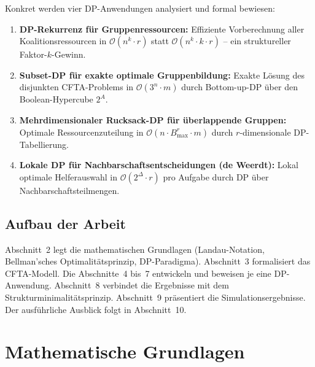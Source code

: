 ﻿\documentclass[a4paper,12pt]{article}
\theoremstyle{definition}
\begin{document}
Konkret werden vier DP-Anwendungen analysiert und formal bewiesen:
\begin{enumerate}
    \item \textbf{DP-Rekurrenz f\"{u}r Gruppenressourcen:} Effiziente
          Vorberechnung aller Koalitionsressourcen in $\mathcal{O}(n^k \cdot r)$
          statt $\mathcal{O}(n^k \cdot k \cdot r)$ -- ein struktureller
          Faktor-$k$-Gewinn.
    \item \textbf{Subset-DP f\"{u}r exakte optimale Gruppenbildung:}
          Exakte L\"{o}sung des disjunkten CFTA-Problems in $\mathcal{O}(3^n \cdot m)$
          durch Bottom-up-DP \"{u}ber den Boolean-Hypercube $2^A$.
    \item \textbf{Mehrdimensionaler Rucksack-DP f\"{u}r \"{u}berlappende Gruppen:}
          Optimale Ressourcenzuteilung in $\mathcal{O}(n \cdot B_{\max}^r \cdot m)$
          durch $r$-dimensionale DP-Tabellierung.
    \item \textbf{Lokale DP f\"{u}r Nachbarschaftsentscheidungen (de Weerdt):}
          Lokal optimale Helferauswahl in $\mathcal{O}(2^\Delta \cdot r)$ pro
          Aufgabe durch DP \"{u}ber Nachbarschaftsteilmengen.
\end{enumerate}

\subsection{Aufbau der Arbeit}

Abschnitt~2 legt die mathematischen Grundlagen (Landau-Notation, Bellman'sches
Optimalit\"{a}tsprinzip, DP-Paradigma). Abschnitt~3 formalisiert das CFTA-Modell.
Die Abschnitte~4 bis~7 entwickeln und beweisen je eine DP-Anwendung.
Abschnitt~8 verbindet die Ergebnisse mit dem Strukturminimalit\"{a}tsprinzip.
Abschnitt~9 pr\"{a}sentiert die Simulationsergebnisse. Der ausf\"{u}hrliche Ausblick
folgt in Abschnitt~10.

\section{Mathematische Grundlagen}
\end{document}
